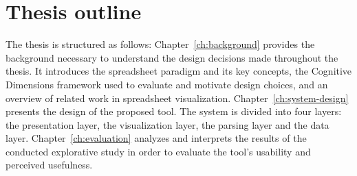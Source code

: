 \section{Thesis outline}
The thesis is structured as follows: Chapter~\ref{ch:background} provides the background necessary to understand the design decisions made throughout the thesis. It introduces the spreadsheet paradigm and its key concepts, the Cognitive Dimensions framework used to evaluate and motivate design choices, and an overview of related work in spreadsheet visualization. Chapter~\ref{ch:system-design} presents the design of the proposed tool. The system is divided into four layers: the presentation layer, the visualization layer, the parsing layer and the data layer. Chapter~\ref{ch:evaluation} analyzes and interprets the results of the conducted explorative study in order to evaluate the tool's usability and perceived usefulness.